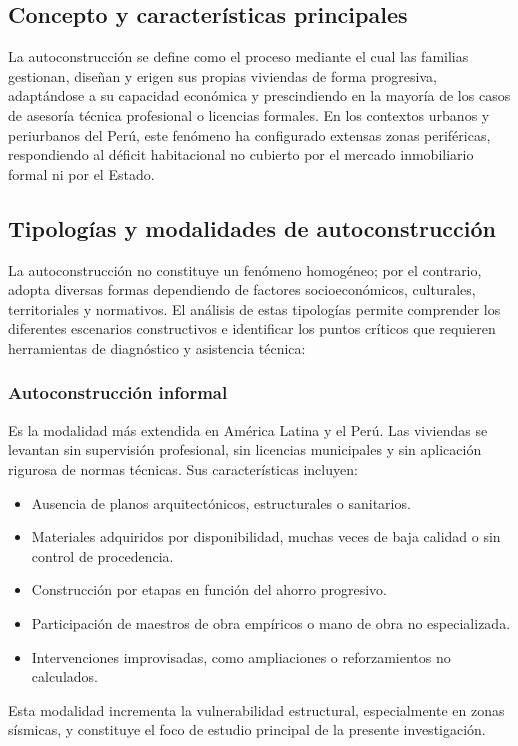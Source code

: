 \documentclass[12pt,oneside]{report}
\begin{document}
\subsection{Concepto y características principales}
La autoconstrucción se define como el proceso mediante el cual las familias gestionan, diseñan y erigen sus propias viviendas de forma progresiva, adaptándose a su capacidad económica y prescindiendo en la mayoría de los casos de asesoría técnica profesional o licencias formales. En los contextos urbanos y periurbanos del Perú, este fenómeno ha configurado extensas zonas periféricas, respondiendo al déficit habitacional no cubierto por el mercado inmobiliario formal ni por el Estado.\par

\subsection{Tipologías y modalidades de autoconstrucción}
La autoconstrucción no constituye un fenómeno homogéneo; por el contrario, adopta diversas formas dependiendo de factores socioeconómicos, culturales, territoriales y normativos. El análisis de estas tipologías permite comprender los diferentes escenarios constructivos e identificar los puntos críticos que requieren herramientas de diagnóstico y asistencia técnica:\par

\subsubsection{Autoconstrucción informal}
Es la modalidad más extendida en América Latina y el Perú. Las viviendas se levantan sin supervisión profesional, sin licencias municipales y sin aplicación rigurosa de normas técnicas. Sus características incluyen:\par
\begin{itemize}
  \item Ausencia de planos arquitectónicos, estructurales o sanitarios.
  \item Materiales adquiridos por disponibilidad, muchas veces de baja calidad o sin control de procedencia.
  \item Construcción por etapas en función del ahorro progresivo.
  \item Participación de maestros de obra empíricos o mano de obra no especializada.
  \item Intervenciones improvisadas, como ampliaciones o reforzamientos no calculados.
\end{itemize}
Esta modalidad incrementa la vulnerabilidad estructural, especialmente en zonas sísmicas, y constituye el foco de estudio principal de la presente investigación.\par
\end{document}
